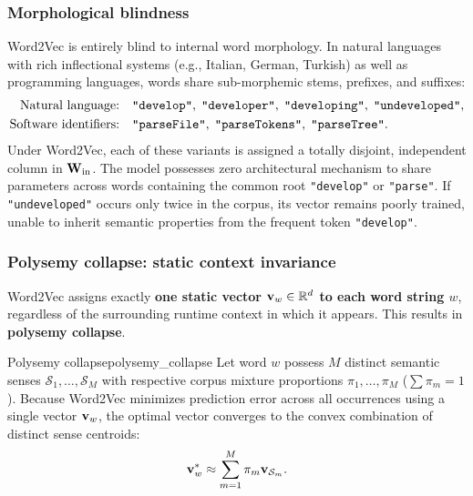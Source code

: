 \documentclass[../../main.tex]{subfiles}
\begin{document}
\subsubsection{Morphological blindness}
\label{subsec:morphological_blindness}

Word2Vec is entirely blind to internal word morphology. In natural languages with rich inflectional systems (e.g., Italian, German, Turkish) as well as programming languages, words share sub-morphemic stems, prefixes, and suffixes:
\begin{align*}
\text{Natural language:} \quad &\text{\texttt{"develop"}}, \; \text{\texttt{"developer"}}, \; \text{\texttt{"developing"}}, \; \text{\texttt{"undeveloped"}}, \\
\text{Software identifiers:} \quad &\text{\texttt{"parseFile"}}, \; \text{\texttt{"parseTokens"}}, \; \text{\texttt{"parseTree"}}.
\end{align*}
Under Word2Vec, each of these variants is assigned a totally disjoint, independent column in $\mathbf{W}_{\text{in}}$. The model possesses zero architectural mechanism to share parameters across words containing the common root \texttt{"develop"} or \texttt{"parse"}. If \texttt{"undeveloped"} occurs only twice in the corpus, its vector remains poorly trained, unable to inherit semantic properties from the frequent token \texttt{"develop"}.

\subsubsection{Polysemy collapse: static context invariance}
\label{subsec:polysemy_collapse}

Word2Vec assigns exactly \textbf{one static vector $\mathbf{v}_w \in \mathbb{R}^d$ to each word string $w$}, regardless of the surrounding runtime context in which it appears. This results in \textbf{polysemy collapse}.

\begin{definition}{Polysemy collapse}{polysemy_collapse}
Let word $w$ possess $M$ distinct semantic senses $\mathcal{S}_1, \dots, \mathcal{S}_M$ with respective corpus mixture proportions $\pi_1, \dots, \pi_M$ ($\sum \pi_m = 1$). Because Word2Vec minimizes prediction error across all occurrences using a single vector $\mathbf{v}_w$, the optimal vector converges to the convex combination of distinct sense centroids:
\begin{equation}
\label{eq:polysemy_convex_combination}
\mathbf{v}_w^* \approx \sum_{m=1}^M \pi_m \mathbf{v}_{\mathcal{S}_m}.
\end{equation}
\end{definition}
\end{document}
